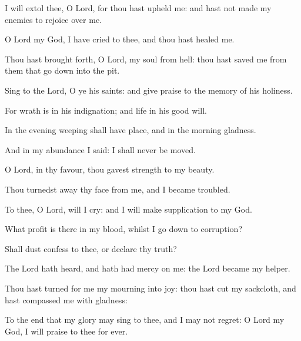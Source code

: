 \item I will extol thee, O Lord, for thou hast upheld me: and hast not made my enemies to rejoice over me.
\item O Lord my God, I have cried to thee, and thou hast healed me.
\item Thou hast brought forth, O Lord, my soul from hell: thou hast saved me from them that go down into the pit.
\item Sing to the Lord, O ye his saints: and give praise to the memory of his holiness.\ifx\enlinebreakafterfour\undefined\else\\\fi
\item For wrath is in his indignation; and life in his good will.
\item In the evening weeping shall have place, and in the morning gladness.
\item And in my abundance I said: I shall never be moved.
\item O Lord, in thy favour, thou gavest strength to my beauty.
\item Thou turnedst away thy face from me, and I became troubled.
\item To thee, O Lord, will I cry: and I will make supplication to my God.
\item What profit is there in my blood, whilst I go down to corruption?
\item Shall dust confess to thee, or declare thy truth?
\item The Lord hath heard, and hath had mercy on me: the Lord became my helper.
\item Thou hast turned for me my mourning into joy: thou hast cut my sackcloth, and hast compassed me with gladness:
\item To the end that my glory may sing to thee, and I may not regret: O Lord my God, I will praise to thee for ever.
